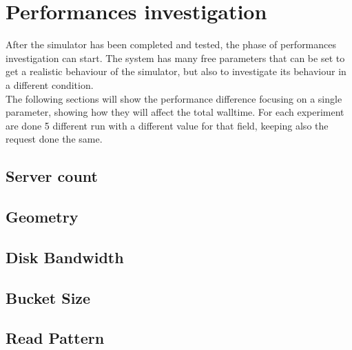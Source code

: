\chapter{Performances investigation}\label{sys-analysis}
After the simulator has been completed and tested, the phase of performances
investigation can start. The system has many free parameters that can be set to
get a realistic behaviour of the simulator, but also to investigate its
behaviour in a different condition. \\
The following sections will show the performance difference focusing on a single
parameter, showing how they will affect the total walltime. For each experiment
are done 5 different run with a different value for that field, keeping also the
request done the same.
\section{Server count}
\section{Geometry}
\section{Disk Bandwidth}
\section{Bucket Size}
\section{Read Pattern}
